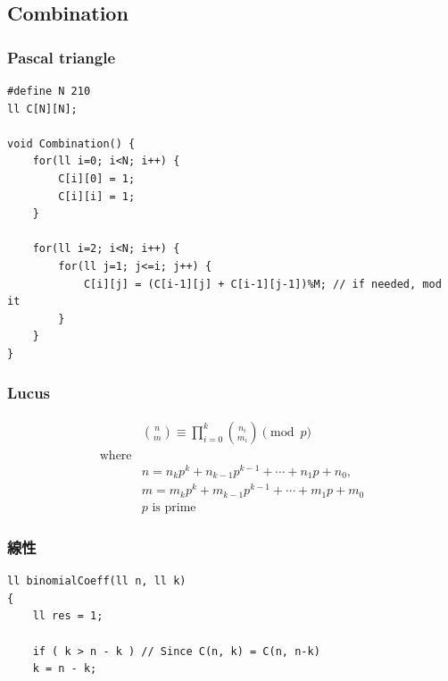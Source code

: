 \documentclass[10pt,oneside]{article}
\begin{document}
\begin{landscape}
\begin{multicols}{2}

\subsection{Combination}

\subsubsection{Pascal triangle}

\begin{verbatim}
#define N 210
ll C[N][N];

void Combination() {
    for(ll i=0; i<N; i++) {
        C[i][0] = 1;
        C[i][i] = 1;
    }
    
    for(ll i=2; i<N; i++) {
        for(ll j=1; j<=i; j++) {
            C[i][j] = (C[i-1][j] + C[i-1][j-1])%M; // if needed, mod it
        }
    }
}
\end{verbatim}

\subsubsection{Lucus}

\begin{equation}
\begin{split}&\binom{n}{m} \equiv \prod_{i=0}^k \binom{n_i}{m_i} \pmod p \\
\text{where}& \\
&n = n_kp^k+n_{k-1}p^{k-1}+\cdots +n_1p+n_0, \\
&m = m_kp^k+m_{k-1}p^{k-1}+\cdots +m_1p+m_0 \\
&p \text{ is prime}
\end{split}
\end{equation}


\subsubsection{線性}

\begin{verbatim}
ll binomialCoeff(ll n, ll k)
{
    ll res = 1;
    
    if ( k > n - k ) // Since C(n, k) = C(n, n-k)
    k = n - k;
    

\end{verbatim}
\end{multicols}
\end{landscape}
\end{document}
